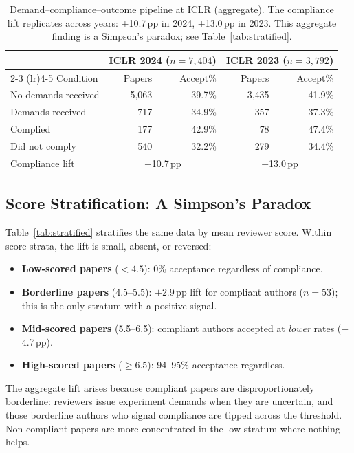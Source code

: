 \documentclass{article}
\begin{document}
\begin{table}[t]
\centering
\caption{Demand--compliance--outcome pipeline at ICLR (aggregate). The compliance lift replicates across years: $+$10.7\,pp in 2024, $+$13.0\,pp in 2023. This aggregate finding is a Simpson's paradox; see Table~\ref{tab:stratified}.}
\label{tab:demand_compliance}
\small
\begin{tabular}{@{}lrrrr@{}}
\toprule
& \multicolumn{2}{c}{ICLR 2024 ($n = 7{,}404$)} & \multicolumn{2}{c}{ICLR 2023 ($n = 3{,}792$)} \\
\cmidrule(lr){2-3} \cmidrule(lr){4-5}
Condition & Papers & Accept\% & Papers & Accept\% \\
\midrule
No demands received & 5{,}063 & 39.7\% & 3{,}435 & 41.9\% \\
Demands received & 717 & 34.9\% & 357 & 37.3\% \\
\quad Complied & 177 & 42.9\% & 78 & 47.4\% \\
\quad Did not comply & 540 & 32.2\% & 279 & 34.4\% \\
\midrule
Compliance lift & \multicolumn{2}{c}{$+$10.7\,pp} & \multicolumn{2}{c}{$+$13.0\,pp} \\
\bottomrule
\end{tabular}
\end{table}

\subsection{Score Stratification: A Simpson's Paradox}

Table~\ref{tab:stratified} stratifies the same data by mean reviewer score. Within score strata, the lift is small, absent, or reversed:

\begin{itemize}[leftmargin=*]
\item \textbf{Low-scored papers} ($< 4.5$): 0\% acceptance regardless of compliance.
\item \textbf{Borderline papers} (4.5--5.5): $+$2.9\,pp lift for compliant authors ($n = 53$); this is the only stratum with a positive signal.
\item \textbf{Mid-scored papers} (5.5--6.5): compliant authors accepted at \textit{lower} rates ($-$4.7\,pp).
\item \textbf{High-scored papers} ($\geq 6.5$): 94--95\% acceptance regardless.
\end{itemize}

The aggregate lift arises because compliant papers are disproportionately borderline: reviewers issue experiment demands when they are uncertain, and those borderline authors who signal compliance are tipped across the threshold. Non-compliant papers are more concentrated in the low stratum where nothing helps.
\end{document}
